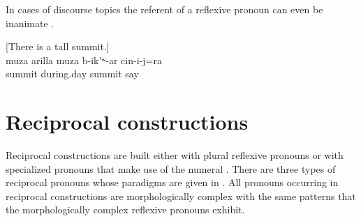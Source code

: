 In cases of discourse topics the referent of a reflexive pronoun can even be inanimate .
%
\begin{exe}
	\ex	\label{ex:‎[‎‎There is a tall summit.] It is called the midday summit} ‎[‎‎There is a tall summit.] \\
	\gll	muza	arilla	muza	b-ik'ʷ-ar	cin-i-j=ra\\
		summit	during.day	summit	say	\\
	\glt	{}
\end{exe}



\section{Reciprocal constructions}
\label{sec:Reciprocal constructionss}

Reciprocal constructions are built either with plural reflexive pronouns  or with specialized pronouns that make use of the numeral  . There are three types of reciprocal pronouns whose paradigms are given in . All pronouns occurring in reciprocal constructions are morphologically complex with the same patterns that the morphologically complex reflexive pronouns exhibit.

